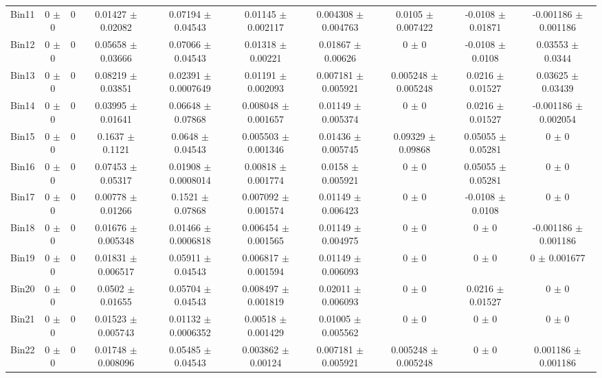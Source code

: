 \begin{tabular}{@{\extracolsep{4pt}}lccccccccc@{}}
     Bin11 & 0 $\pm$ 0 & 0 & 0.01427 $\pm$ 0.02082 & 0.07194 $\pm$ 0.04543 & 0.01145 $\pm$ 0.002117 & 0.004308 $\pm$ 0.004763 & 0.0105 $\pm$ 0.007422 & -0.0108 $\pm$ 0.01871 & -0.001186 $\pm$ 0.001186 \\ 
     Bin12 & 0 $\pm$ 0 & 0 & 0.05658 $\pm$ 0.03666 & 0.07066 $\pm$ 0.04543 & 0.01318 $\pm$ 0.00221 & 0.01867 $\pm$ 0.00626 & 0 $\pm$ 0 & -0.0108 $\pm$ 0.0108 & 0.03553 $\pm$ 0.0344 \\ 
     Bin13 & 0 $\pm$ 0 & 0 & 0.08219 $\pm$ 0.03851 & 0.02391 $\pm$ 0.0007649 & 0.01191 $\pm$ 0.002093 & 0.007181 $\pm$ 0.005921 & 0.005248 $\pm$ 0.005248 & 0.0216 $\pm$ 0.01527 & 0.03625 $\pm$ 0.03439 \\ 
     Bin14 & 0 $\pm$ 0 & 0 & 0.03995 $\pm$ 0.01641 & 0.06648 $\pm$ 0.07868 & 0.008048 $\pm$ 0.001657 & 0.01149 $\pm$ 0.005374 & 0 $\pm$ 0 & 0.0216 $\pm$ 0.01527 & -0.001186 $\pm$ 0.002054 \\ 
     Bin15 & 0 $\pm$ 0 & 0 & 0.1637 $\pm$ 0.1121 & 0.0648 $\pm$ 0.04543 & 0.005503 $\pm$ 0.001346 & 0.01436 $\pm$ 0.005745 & 0.09329 $\pm$ 0.09868 & 0.05055 $\pm$ 0.05281 & 0 $\pm$ 0 \\ 
     Bin16 & 0 $\pm$ 0 & 0 & 0.07453 $\pm$ 0.05317 & 0.01908 $\pm$ 0.0008014 & 0.00818 $\pm$ 0.001774 & 0.0158 $\pm$ 0.005921 & 0 $\pm$ 0 & 0.05055 $\pm$ 0.05281 & 0 $\pm$ 0 \\ 
     Bin17 & 0 $\pm$ 0 & 0 & 0.00778 $\pm$ 0.01266 & 0.1521 $\pm$ 0.07868 & 0.007092 $\pm$ 0.001574 & 0.01149 $\pm$ 0.006423 & 0 $\pm$ 0 & -0.0108 $\pm$ 0.0108 & 0 $\pm$ 0 \\ 
     Bin18 & 0 $\pm$ 0 & 0 & 0.01676 $\pm$ 0.005348 & 0.01466 $\pm$ 0.0006818 & 0.006454 $\pm$ 0.001565 & 0.01149 $\pm$ 0.004975 & 0 $\pm$ 0 & 0 $\pm$ 0 & -0.001186 $\pm$ 0.001186 \\ 
     Bin19 & 0 $\pm$ 0 & 0 & 0.01831 $\pm$ 0.006517 & 0.05911 $\pm$ 0.04543 & 0.006817 $\pm$ 0.001594 & 0.01149 $\pm$ 0.006093 & 0 $\pm$ 0 & 0 $\pm$ 0 & 0 $\pm$ 0.001677 \\ 
     Bin20 & 0 $\pm$ 0 & 0 & 0.0502 $\pm$ 0.01655 & 0.05704 $\pm$ 0.04543 & 0.008497 $\pm$ 0.001819 & 0.02011 $\pm$ 0.006093 & 0 $\pm$ 0 & 0.0216 $\pm$ 0.01527 & 0 $\pm$ 0 \\ 
     Bin21 & 0 $\pm$ 0 & 0 & 0.01523 $\pm$ 0.005743 & 0.01132 $\pm$ 0.0006352 & 0.00518 $\pm$ 0.001429 & 0.01005 $\pm$ 0.005562 & 0 $\pm$ 0 & 0 $\pm$ 0 & 0 $\pm$ 0 \\ 
     Bin22 & 0 $\pm$ 0 & 0 & 0.01748 $\pm$ 0.008096 & 0.05485 $\pm$ 0.04543 & 0.003862 $\pm$ 0.00124 & 0.007181 $\pm$ 0.005921 & 0.005248 $\pm$ 0.005248 & 0 $\pm$ 0 & 0.001186 $\pm$ 0.001186 \\ 

\end{tabular}
